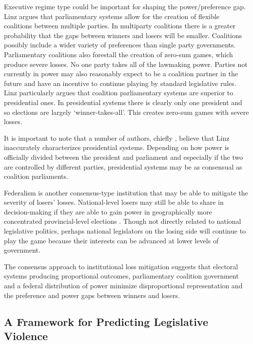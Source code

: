 \documentclass[a4paper]{article}\usepackage{graphicx, color}
\begin{document}
{Executive regime type could be important for shaping the power/preference gap. Linz \citeyearpar{LinzPres1990, LinzParl1990} argues that parliamentary systems allow for the creation of flexible coalitions between multiple parties. In multiparty coalitions there is a greater probability that the gaps between winners and losers will be smaller. Coalitions possibly include a wider variety of preferences than single party governments. Parliamentary coalitions also forestall the creation of zero-sum games, which produce severe losses. No one party takes all of the lawmaking power. Parties not currently in power may also reasonably expect to be a coalition partner in the future and have an incentive to continue playing by standard legislative rules. Linz particularly argues that coalition parliamentary systems are superior to presidential ones. In presidential systems there is clearly only one president and so elections are largely `winner-takes-all'. This creates zero-sum games with severe losses. 

It is important to note that a number of authors, chiefly \cite{Horowitz1990}, believe that Linz inaccurately characterizes presidential systems. Depending on how power is officially divided between the president and parliament and especially if the two are controlled by different parties, presidential systems may be as consensual as coalition parliaments.

Federalism is another consensus-type institution that may be able to mitigate the severity of losers' losses. National-level losers may still be able to share in decision-making if they are able to gain power in geographically more concentrated provincial-level elections \citep{Anderson2005, Lijphart2004}. Though not directly related to national legislative politics, perhaps national legislators on the losing side will continue to play the game because their interests can be advanced at lower levels of government. 

The consensus approach to institutional loss mitigation suggests that electoral systems producing proportional outcomes, parliamentary coalition government and a federal distribution of power minimize disproportional representation and the preference and power gaps between winners and losers. 

\vspace{0.5cm}

\subsection{A Framework for Predicting Legislative Violence}

}
\end{document}
